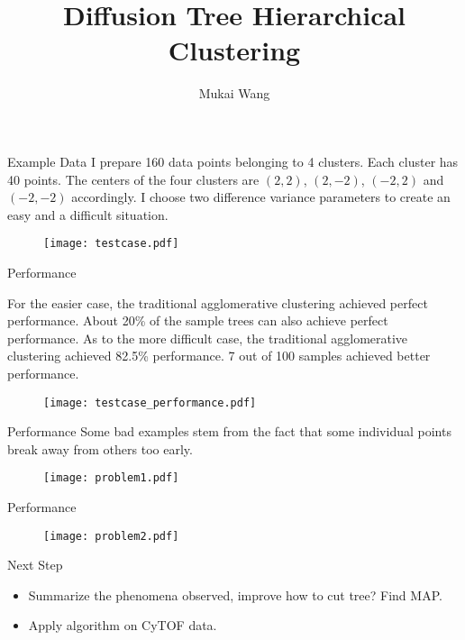 \documentclass{beamer}
\title[Bayesian Hierarchical Clustering]{Diffusion Tree Hierarchical Clustering}
\author{Mukai Wang}
\begin{document}
	\begin{frame}
		\titlepage
	\end{frame}
	
	\begin{frame}{Example Data}
		\small
		I prepare 160 data points belonging to 4 clusters. Each cluster has 40 points. The centers of the four clusters are $(2,2)$, $(2,-2)$, $(-2, 2)$ and $(-2, -2)$ accordingly. I choose two difference variance parameters to create an easy and a difficult situation.
		\begin{figure}[htbp]
			\centering
			\texttt{[image: testcase.pdf]}
		\end{figure}
	\end{frame}

	\begin{frame}{Performance}
		\small 
		
		For the easier case, the traditional agglomerative clustering achieved perfect performance. About 20\% of the sample trees can also achieve perfect performance. As to the more difficult case, the traditional agglomerative clustering achieved 82.5\% performance. 7 out of 100 samples achieved better performance.
		
		\begin{figure}[htbp]
			\centering
			\texttt{[image: testcase\_performance.pdf]}
		\end{figure}
	\end{frame}
	
	\begin{frame}{Performance}
		Some bad examples stem from the fact that some individual points break away from others too early.
		\begin{figure}[htbp]
			\centering
			\texttt{[image: problem1.pdf]}
		\end{figure}
	\end{frame}

	\begin{frame}{Performance}
		\begin{figure}[htbp]
			\centering
			\texttt{[image: problem2.pdf]}
		\end{figure}
	\end{frame}

	\begin{frame}{Next Step}
		\begin{itemize}
			\item Summarize the phenomena observed, improve how to cut tree? Find MAP.
			\item Apply algorithm on CyTOF data.
		\end{itemize}
	\end{frame}
\end{document}
